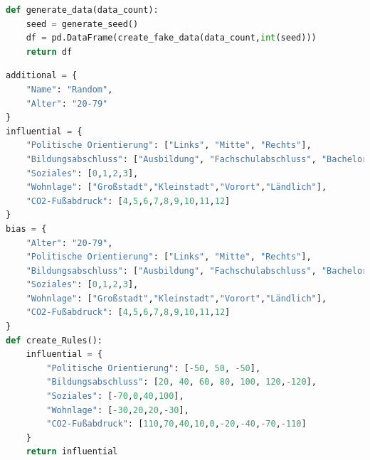 \documentclass[a4paper,12pt]{report}
\begin{document}
\begin{lstlisting}[language=Python,label={lst:Sz2Z4},caption=Vierte Zelle Methode zum Generieren der Daten]
def generate_data(data_count):
    seed = generate_seed()
    df = pd.DataFrame(create_fake_data(data_count,int(seed)))
    return df
\end{lstlisting}
\begin{lstlisting}[language=Python,label={lst:Sz2Z5},caption=Fünfte Zelle Methode zum Erstellen der Regeln]
additional = {
    "Name": "Random",
    "Alter": "20-79"
}
influential = {
    "Politische Orientierung": ["Links", "Mitte", "Rechts"],
    "Bildungsabschluss": ["Ausbildung", "Fachschulabschluss", "Bachelor", "Master", "Diplom", "Promotion","ohne"],
    "Soziales": [0,1,2,3],
    "Wohnlage": ["Großstadt","Kleinstadt","Vorort","Ländlich"],
    "CO2-Fußabdruck": [4,5,6,7,8,9,10,11,12]
}
bias = {
    "Alter": "20-79",
    "Politische Orientierung": ["Links", "Mitte", "Rechts"],
    "Bildungsabschluss": ["Ausbildung", "Fachschulabschluss", "Bachelor", "Master", "Diplom", "Promotion","ohne"],
    "Soziales": [0,1,2,3],
    "Wohnlage": ["Großstadt","Kleinstadt","Vorort","Ländlich"],
    "CO2-Fußabdruck": [4,5,6,7,8,9,10,11,12]
}
def create_Rules():
    influential = {
        "Politische Orientierung": [-50, 50, -50],
        "Bildungsabschluss": [20, 40, 60, 80, 100, 120,-120],
        "Soziales": [-70,0,40,100],
        "Wohnlage": [-30,20,20,-30],
        "CO2-Fußabdruck": [110,70,40,10,0,-20,-40,-70,-110]
    }
    return influential
\end{lstlisting}
\end{document}

